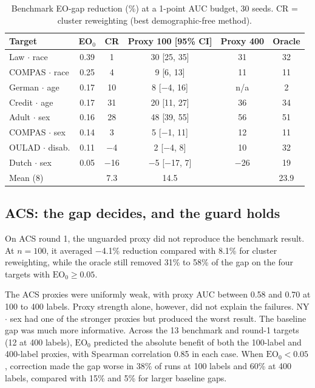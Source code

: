 \documentclass[conference]{IEEEtran}
\newcommand{\EO}{\mathrm{EO}}
\begin{document}
\begin{table}[t]
\caption{Benchmark EO-gap reduction (\%) at a 1-point AUC budget, 30 seeds. CR = cluster reweighting (best demographic-free method).}
\label{tab:bench}
\centering
\footnotesize
\setlength{\tabcolsep}{3pt}
\begin{tabular}{@{}lccccc@{}}
\toprule
Target & EO$_0$ & CR & Proxy 100 [95\% CI] & Proxy 400 & Oracle \\
\midrule
Law $\cdot$ race & 0.39 & 1 & 30 [25, 35] & 31 & 32 \\
COMPAS $\cdot$ race & 0.25 & 4 & 9 [6, 13] & 11 & 11 \\
German $\cdot$ age & 0.17 & 10 & 8 [$-$4, 16] & n/a & 2 \\
Credit $\cdot$ age & 0.17 & 31 & 20 [11, 27] & 36 & 34 \\
Adult $\cdot$ sex & 0.16 & 28 & 48 [39, 55] & 56 & 51 \\
COMPAS $\cdot$ sex & 0.14 & 3 & 5 [$-$1, 11] & 12 & 11 \\
OULAD $\cdot$ disab. & 0.11 & $-$4 & 2 [$-$4, 8] & 10 & 32 \\
Dutch $\cdot$ sex & 0.05 & $-$16 & $-$5 [$-$17, 7] & $-$26 & 19 \\
\midrule
Mean (8) & & 7.3 & 14.5 & & 23.9 \\
\bottomrule
\end{tabular}
\end{table}

\subsection{ACS: the gap decides, and the guard holds}
On ACS round 1, the unguarded proxy did not reproduce the benchmark result. At $n=100$, it averaged $-$4.1\% reduction compared with 8.1\% for cluster reweighting, while the oracle still removed 31\% to 58\% of the gap on the four targets with $\EO_0\ge0.05$.

The ACS proxies were uniformly weak, with proxy AUC between 0.58 and 0.70 at 100 to 400 labels. Proxy strength alone, however, did not explain the failures. NY $\cdot$ sex had one of the stronger proxies but produced the worst result. The baseline gap was much more informative. Across the 13 benchmark and round-1 targets (12 at 400 labels), $\EO_0$ predicted the absolute benefit of both the 100-label and 400-label proxies, with Spearman correlation 0.85 in each case. When $\EO_0<0.05$, correction made the gap worse in 38\% of runs at 100 labels and 60\% at 400 labels, compared with 15\% and 5\% for larger baseline gaps.
\end{document}
